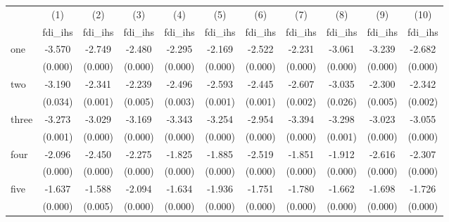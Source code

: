 \begin{tabular}{l*{10}{c}}
\hline\hline
            &\multicolumn{1}{c}{(1)}&\multicolumn{1}{c}{(2)}&\multicolumn{1}{c}{(3)}&\multicolumn{1}{c}{(4)}&\multicolumn{1}{c}{(5)}&\multicolumn{1}{c}{(6)}&\multicolumn{1}{c}{(7)}&\multicolumn{1}{c}{(8)}&\multicolumn{1}{c}{(9)}&\multicolumn{1}{c}{(10)}\\
            &\multicolumn{1}{c}{fdi\_ihs}&\multicolumn{1}{c}{fdi\_ihs}&\multicolumn{1}{c}{fdi\_ihs}&\multicolumn{1}{c}{fdi\_ihs}&\multicolumn{1}{c}{fdi\_ihs}&\multicolumn{1}{c}{fdi\_ihs}&\multicolumn{1}{c}{fdi\_ihs}&\multicolumn{1}{c}{fdi\_ihs}&\multicolumn{1}{c}{fdi\_ihs}&\multicolumn{1}{c}{fdi\_ihs}\\
\hline
one         &      -3.570&      -2.749&      -2.480&      -2.295&      -2.169&      -2.522&      -2.231&      -3.061&      -3.239&      -2.682\\
            &     (0.000)&     (0.000)&     (0.000)&     (0.000)&     (0.000)&     (0.000)&     (0.000)&     (0.000)&     (0.000)&     (0.000)\\
[1em]
two         &      -3.190&      -2.341&      -2.239&      -2.496&      -2.593&      -2.445&      -2.607&      -3.035&      -2.300&      -2.342\\
            &     (0.034)&     (0.001)&     (0.005)&     (0.003)&     (0.001)&     (0.001)&     (0.002)&     (0.026)&     (0.005)&     (0.002)\\
[1em]
three       &      -3.273&      -3.029&      -3.169&      -3.343&      -3.254&      -2.954&      -3.394&      -3.298&      -3.023&      -3.055\\
            &     (0.001)&     (0.000)&     (0.000)&     (0.000)&     (0.000)&     (0.000)&     (0.000)&     (0.001)&     (0.000)&     (0.000)\\
[1em]
four        &      -2.096&      -2.450&      -2.275&      -1.825&      -1.885&      -2.519&      -1.851&      -1.912&      -2.616&      -2.307\\
            &     (0.000)&     (0.000)&     (0.000)&     (0.000)&     (0.000)&     (0.000)&     (0.000)&     (0.000)&     (0.000)&     (0.000)\\
[1em]
five        &      -1.637&      -1.588&      -2.094&      -1.634&      -1.936&      -1.751&      -1.780&      -1.662&      -1.698&      -1.726\\
            &     (0.000)&     (0.005)&     (0.000)&     (0.000)&     (0.000)&     (0.000)&     (0.000)&     (0.000)&     (0.000)&     (0.000)\\

\end{tabular}
